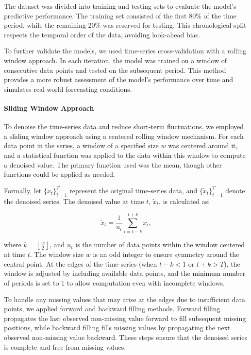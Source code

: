 The dataset was divided into training and testing sets to evaluate the model's predictive performance. The training set consisted of the first 80\% of the time period, while the remaining 20\% was reserved for testing. This chronological split respects the temporal order of the data, avoiding look-ahead bias.

To further validate the models, we used time-series cross-validation with a rolling window approach. In each iteration, the model was trained on a window of consecutive data points and tested on the subsequent period. This method provides a more robust assessment of the model's performance over time and simulates real-world forecasting conditions.

\paragraph{Sliding Window Approach}

To denoise the time-series data and reduce short-term fluctuations, we employed a sliding window approach using a centered rolling window mechanism. For each data point in the series, a window of a specified size $w$ was centered around it, and a statistical function was applied to the data within this window to compute a denoised value. The primary function used was the mean, though other functions could be applied as needed.

Formally, let $\{ x_t \}_{t=1}^T$ represent the original time-series data, and $\{ \tilde{x}_t \}_{t=1}^T$ denote the denoised series. The denoised value at time $t$, $\tilde{x}_t$, is calculated as:

\begin{equation}
\tilde{x}_t = \frac{1}{n_t} \sum_{i = t - k}^{t + k} x_i,
\end{equation}

where $k = \left\lfloor \frac{w}{2} \right\rfloor$, and $n_t$ is the number of data points within the window centered at time $t$. The window size $w$ is an odd integer to ensure symmetry around the central point. At the edges of the time-series (when $t - k < 1$ or $t + k > T$), the window is adjusted by including available data points, and the minimum number of periods is set to 1 to allow computation even with incomplete windows.

To handle any missing values that may arise at the edges due to insufficient data points, we applied forward and backward filling methods. Forward filling propagates the last observed non-missing value forward to fill subsequent missing positions, while backward filling fills missing values by propagating the next observed non-missing value backward. These steps ensure that the denoised series is complete and free from missing values.


